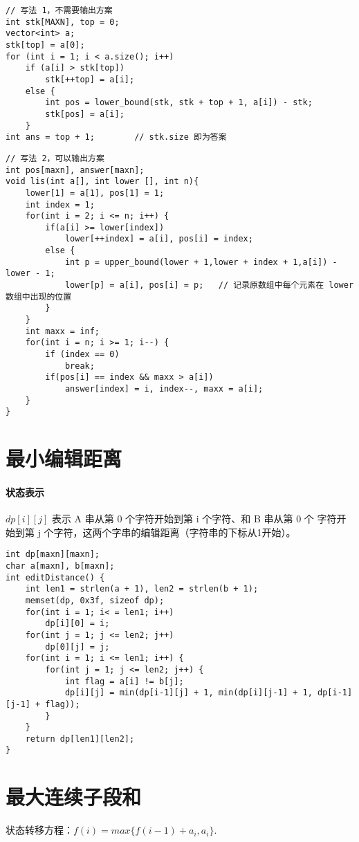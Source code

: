 \begin{verbatim}
// 写法 1，不需要输出方案
int stk[MAXN], top = 0;
vector<int> a;
stk[top] = a[0];
for (int i = 1; i < a.size(); i++)
    if (a[i] > stk[top])
        stk[++top] = a[i];
    else {
        int pos = lower_bound(stk, stk + top + 1, a[i]) - stk;
        stk[pos] = a[i];
    }
int ans = top + 1;        // stk.size 即为答案
\end{verbatim}

\begin{verbatim}
// 写法 2，可以输出方案
int pos[maxn], answer[maxn];
void lis(int a[], int lower [], int n){
    lower[1] = a[1], pos[1] = 1;
    int index = 1;
    for(int i = 2; i <= n; i++) {
        if(a[i] >= lower[index])
            lower[++index] = a[i], pos[i] = index;
        else {
            int p = upper_bound(lower + 1,lower + index + 1,a[i]) - lower - 1;
            lower[p] = a[i], pos[i] = p;   // 记录原数组中每个元素在 lower 数组中出现的位置
        }
    }
    int maxx = inf;
    for(int i = n; i >= 1; i--) {
        if (index == 0)
            break;
        if(pos[i] == index && maxx > a[i])
            answer[index] = i, index--, maxx = a[i];
    }
}
\end{verbatim}

\section{最小编辑距离}
\paragraph{状态表示} $dp[i][j]$ 表示 A 串从第 0 个字符开始到第 i 个字符、和 B 串从第 0 个
字符开始到第 j 个字符，这两个字串的编辑距离（字符串的下标从1开始）。

\begin{verbatim}
int dp[maxn][maxn];
char a[maxn], b[maxn];
int editDistance() {
    int len1 = strlen(a + 1), len2 = strlen(b + 1);
    memset(dp, 0x3f, sizeof dp);
    for(int i = 1; i< = len1; i++)
        dp[i][0] = i;
    for(int j = 1; j <= len2; j++)
        dp[0][j] = j;
    for(int i = 1; i <= len1; i++) {
        for(int j = 1; j <= len2; j++) {
            int flag = a[i] != b[j];
            dp[i][j] = min(dp[i-1][j] + 1, min(dp[i][j-1] + 1, dp[i-1][j-1] + flag));
        }
    }
    return dp[len1][len2];
}
\end{verbatim}

\section{最大连续子段和}
状态转移方程：$f(i) = max\{f(i-1) + a_i, a_i\}$.